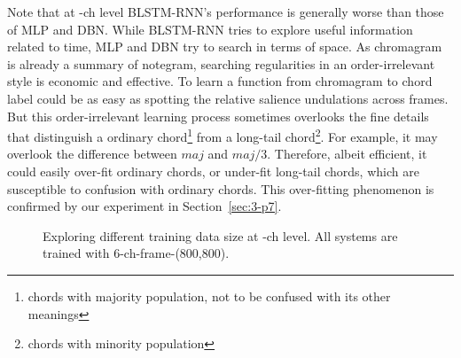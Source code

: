 
Note that at -ch level BLSTM-RNN's performance is generally worse than those of MLP and DBN. While BLSTM-RNN tries to explore useful information related to time, MLP and DBN try to search in terms of space. As chromagram is already a summary of notegram, searching regularities in an order-irrelevant style is economic and effective. To learn a function from chromagram to chord label could be as easy as spotting the relative salience undulations across frames. But this order-irrelevant learning process sometimes overlooks the fine details that distinguish a ordinary chord\footnote{chords with majority population, not to be confused with its other meanings} from a long-tail chord\footnote{chords with minority population}. For example, it may overlook the difference between $maj$ and $maj/3$. Therefore, albeit efficient, it could easily over-fit ordinary chords, or under-fit long-tail chords, which are susceptible to confusion with ordinary chords. This over-fitting phenomenon is confirmed by our experiment in Section~\ref{sec:3-p7}.

\label{sec:3-p5}

\begin{figure}[htb]
\centering
{}
\caption{Exploring different training data size at -ch level. All systems are trained with 6-ch-frame-(800,800).}
\label{fig:3-ch-data}
\end{figure}

